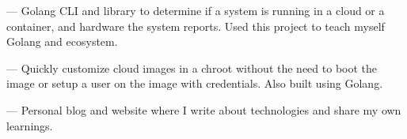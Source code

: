 

\begin{cventries}
\vspace{-4mm}

  \cventry
    {}
    {}
    {}
    {}
    {
      \begin{cvitems}
        \item {
           —
          Golang CLI and library to determine if a system is running in a
          cloud or a container, and hardware the system reports. Used this
          project to teach myself Golang and ecosystem.
        }
        \item {
           —
          Quickly customize cloud images in a chroot without the
          need to boot the image or setup a user on the image with credentials.
          Also built using Golang.
        }
        \item {
           — Personal blog and
          website where I write about technologies and share my own learnings.
        }
      \end{cvitems}
    }
    {}

\end{cventries}
